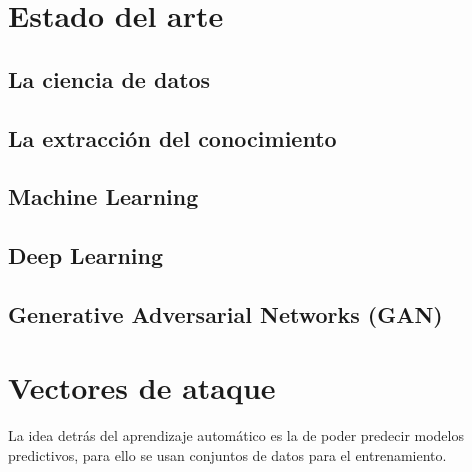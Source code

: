 


\section{Estado del arte}

\subsection{La ciencia de datos}
\subsection{La extracción del conocimiento}


\subsection{Machine Learning}
\subsection{Deep Learning}
\subsection{Generative Adversarial Networks (GAN)}



\section{Vectores de ataque}

La idea detrás del aprendizaje automático es la de poder predecir modelos predictivos, para ello se usan conjuntos de datos para el entrenamiento.


